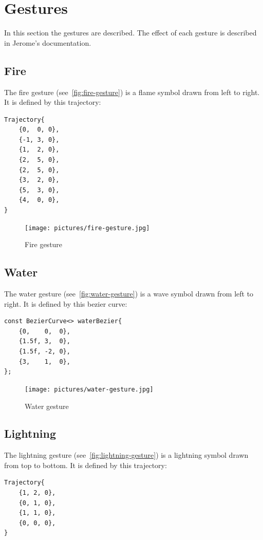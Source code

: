\section{Gestures}
In this section the gestures are described.
The effect of each gesture is described in Jerome\rq{}s documentation.

\subsection{Fire}
The fire gesture (see~\autoref{fig:fire-gesture}) is a flame symbol drawn from left to right.
It is defined by this trajectory:

\begin{lstlisting}
Trajectory{
    {0,  0, 0},
    {-1, 3, 0},
    {1,  2, 0},
    {2,  5, 0},
    {2,  5, 0},
    {3,  2, 0},
    {5,  3, 0},
    {4,  0, 0},
}
\end{lstlisting}

\begin{figure}[!ht]
    \texttt{[image: pictures/fire-gesture.jpg]}
    \caption{Fire gesture}
    \label{fig:fire-gesture}
\end{figure}


\subsection{Water}
The water gesture (see~\autoref{fig:water-gesture}) is a wave symbol drawn from left to right.
It is defined by this bezier curve:

\begin{lstlisting}
const BezierCurve<> waterBezier{
    {0,    0,  0},
    {1.5f, 3,  0},
    {1.5f, -2, 0},
    {3,    1,  0},
};
\end{lstlisting}

\begin{figure}[!ht]
    \texttt{[image: pictures/water-gesture.jpg]}
    \caption{Water gesture}
    \label{fig:water-gesture}
\end{figure}


\subsection{Lightning}
The lightning gesture (see~\autoref{fig:lightning-gesture}) is a lightning symbol drawn from top to bottom.
It is defined by this trajectory:

\begin{lstlisting}
Trajectory{
    {1, 2, 0},
    {0, 1, 0},
    {1, 1, 0},
    {0, 0, 0},
}
\end{lstlisting}

